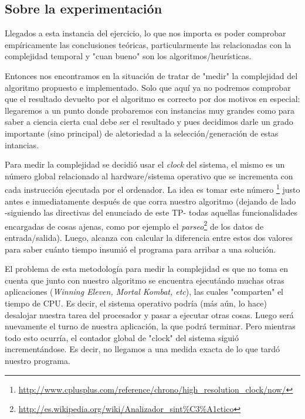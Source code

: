 {}
\subsection*{Sobre la experimentaci\'on}
\par Llegados a esta instancia del ejercicio, lo que nos importa es poder
    comprobar emp\'iricamente las conclusiones te\'oricas, particularmente
    las relacionadas con la complejidad temporal y "cuan bueno" son los
    algoritmos/heur\'isticas.

\par Entonces nos encontramos en la situaci\'on de tratar de "medir"
    la complejidad del algoritmo propuesto e implementado. Solo que aqu\'i ya no podremos
    comprobar que el resultado devuelto por el algoritmo es correcto por dos
    motivos en especial: llegaremos a un punto donde probaremos con instancias
    muy grandes como para saber a ciencia cierta cual debe ser el resultado y
    pues decidimos darle un grado importante (sino principal) de aletoriedad
    a la selecci\'on/generaci\'on de estas intancias.

\par Para medir la complejidad se decidi\'o usar el \emph{clock} del sistema,
    el mismo es un n\'umero global relacionado al hardware/sistema operativo
    que se incrementa con cada instrucci\'on ejecutada por el ordenador. La idea
    es tomar este n\'umero \footnote{%
    \url{http://www.cplusplus.com/reference/chrono/high_resolution_clock/now/}}
    justo antes e inmediatamente despu\'es de que corra nuestro algoritmo
    (dejando de lado -siguiendo las directivas del enunciado de este TP-
    todas aquellas funcionalidades encargadas de cosas ajenas, como
    por ejemplo el \emph{parseo}\footnote{%
    \url{http://es.wikipedia.org/wiki/Analizador_sint\%C3\%A1ctico}} de los datos
    de entrada/salida). Luego, alcanza con calcular la diferencia entre estos dos
    valores para saber cu\'anto tiempo insumi\'o el programa para arribar a una soluci\'on.

\par El problema de esta metodolog\'ia para medir la complejidad es que no
    toma en cuenta que junto con nuestro algoritmo se encuentra ejecut\'ando
    muchas otras aplicaciones (\emph{Winning Eleven, Mortal Kombat, etc}), las
    cuales "comparten" el tiempo de CPU. Es decir, el sistema operativo podr\'ia
    (m\'as a\'un, lo hace) desalojar nuestra tarea del procesador y pasar a
    ejecutar otras cosas. Luego ser\'a nuevamente el turno de nuestra
    aplicaci\'on, la que podr\'a terminar. Pero mientras todo esto ocurr\'ia,
    el contador global de "clock" del sistema sigui\'o increment\'andose. Es
    decir, no llegamos a una medida exacta de lo que tard\'o nuestro programa.

